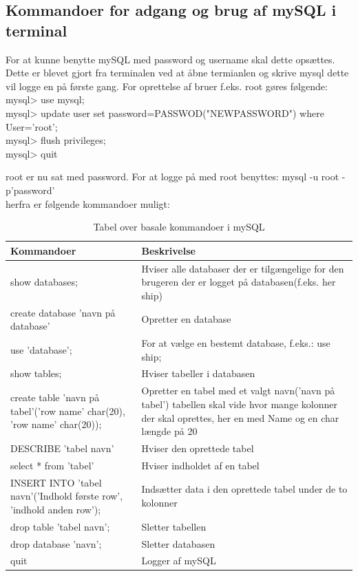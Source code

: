 \subsection*{Kommandoer for adgang og brug af mySQL i terminal}
For at kunne benytte mySQL med password og username skal dette opsættes. Dette er blevet gjort fra terminalen ved at åbne termianlen og skrive mysql dette vil logge en på første gang. For oprettelse af bruer f.eks. root gøres følgende:\\
mysql> use mysql;\\
mysql> update user set password=PASSWOD("NEWPASSWORD") where User='root';\\
mysql> flush privileges;\\
mysql> quit

root er nu sat med password. For at logge på med root benyttes:
mysql -u root -p'password'\\
herfra er følgende kommandoer muligt:
\begin{table}[H]
\begin{tabular}{|p{5cm}|p{10cm}|} \hline
\cellcolor[gray]{0.85}Kommandoer& \cellcolor[gray]{0.85}Beskrivelse  \\ \hline
show databases; & Hviser alle databaser der er tilgængelige for den brugeren der er logget på databasen(f.eks. her ship)   \\ \hline
create database 'navn på database' & Opretter en database   \\ \hline
use 'database'; & For at vælge en bestemt database, f.eks.: use ship;    \\ \hline
show tables; & Hviser tabeller i databasen   \\ \hline
create table 'navn på tabel'('row name' char(20), 'row name' char(20));  & Opretter en tabel med et valgt navn('navn på tabel') tabellen skal vide hvor mange kolonner der skal oprettes, her en med Name og en char længde på 20   \\ \hline
DESCRIBE 'tabel navn' & Hviser den oprettede tabel   \\ \hline
select * from 'tabel' & Hviser indholdet af en tabel   \\ \hline
INSERT INTO 'tabel navn'('Indhold første row', 'indhold anden row');  & Indsætter data i den oprettede tabel under de to kolonner   \\ \hline
drop table 'tabel navn'; & Sletter tabellen\\ \hline
drop database 'navn'; & Sletter databasen\\ \hline
quit & Logger af mySQL\\ \hline
\end{tabular}
\caption{Tabel over basale kommandoer i mySQL}
\label{table:mysqlKommandoer}
\end{table}


